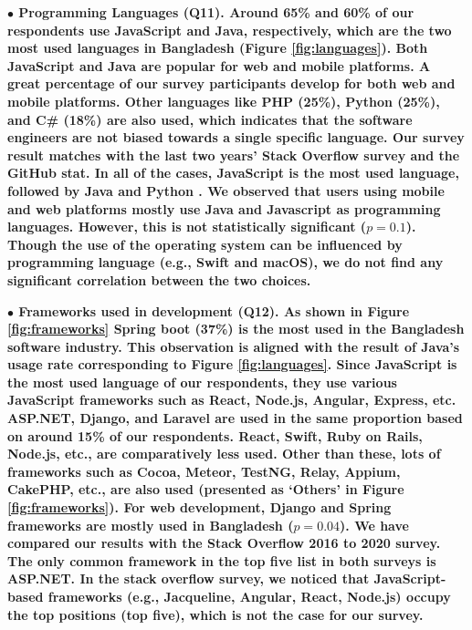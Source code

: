 \nd\bf{$\bullet$ Programming Languages (Q11).} Around 65\% and 60\% of our respondents use JavaScript and
Java, respectively, which are the two most used languages in Bangladesh (Figure
\ref{fig:languages}). Both JavaScript and Java are popular for web and mobile
platforms. A great percentage of our survey participants develop for both
web and mobile platforms. Other languages
like PHP (25\%), Python (25\%), and C\# (18\%) are also used, which indicates
that the software engineers are not biased towards a single specific language.
Our survey result matches with the last two years' Stack Overflow survey and the
GitHub stat. In all of the cases, JavaScript is the most used language, followed
by Java and Python \citep{StackoverflowSurvey2020, StackoverflowSurvey2019,
GithubStat}. We
observed that users using mobile and web platforms mostly use Java and
Javascript as programming languages. However, this is not statistically
significant ($p=0.1$). Though the use of the operating system can be influenced by
programming language (e.g., Swift and macOS), we do not find any significant correlation
between the two choices.

\nd\bf{$\bullet$ Frameworks used in development (Q12).} As shown in Figure \ref{fig:frameworks} Spring boot (37\%) is the most used in the Bangladesh software industry. 
This observation is aligned with the result of Java's usage rate corresponding
to Figure \ref{fig:languages}. Since JavaScript is the most used language of our
respondents, they use various JavaScript frameworks such as React, Node.js,
Angular, Express, etc. ASP.NET, Django, and
Laravel are used in the same proportion based on around 15\% of our respondents.
React, Swift, Ruby on Rails, Node.js, etc., are comparatively less used. Other
than these, lots of frameworks such as Cocoa, Meteor, TestNG, Relay, Appium,
CakePHP, etc., are also used (presented as `Others' in Figure \ref{fig:frameworks}). For web development, Django
and Spring frameworks are mostly used in Bangladesh ($p=0.04$). We have compared
our results with the Stack Overflow 2016 to 2020
survey\citep{StackoverflowSurvey2017, StackoverflowSurvey2018,
StackoverflowSurvey2019, StackoverflowSurvey2020}. The only common framework in
the top five list in both surveys is ASP.NET. In the stack overflow survey, we
noticed that JavaScript-based frameworks (e.g., Jacqueline, Angular, React,
Node.js) occupy the top positions (top five), which is not the case for our
survey.

